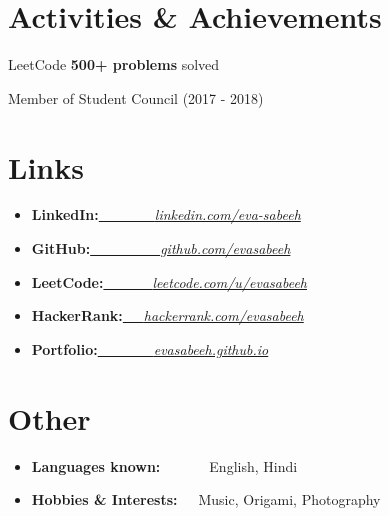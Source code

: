 \documentclass[a4paper,20pt]{article}
\newcommand{\resumeSimpleItem}[2]{
  \item\small{
    {#1}{#2 \vspace{-2pt}}
  }
}
\newcommand{\resumeSimpleSubItem}[2]{\resumeSimpleItem{#1}{#2}\vspace{-3pt}}
\newcommand{\resumeSubHeadingSimpleListStart}{\begin{itemize}[leftmargin=*]}
\newcommand{\resumeSubHeadingSimpleListEnd}{\end{itemize}}
\begin{document}
\section{Activities \& Achievements}
\begin{description}[font=$\bullet$]
  \item {LeetCode \textbf{500+ problems} solved}
  \vspace{-5pt}
  \item {Member of Student Council (2017 - 2018)}
  \vspace{-5pt}
  \end{description}
\vspace{2pt}



\section{Links}
\resumeSubHeadingSimpleListStart
\resumeSimpleSubItem{\textbf{LinkedIn:}}{\href{https://www.linkedin.com/in/eva-sabeeh/}{~~~~~~~~\emph{linkedin.com/eva-sabeeh}}}
\vspace{-1pt}
\resumeSimpleSubItem{\textbf{GitHub:}}{\href{https://www.github.com/evasabeeh/}{~~~~~~~~~~\emph{github.com/evasabeeh}}}
\vspace{-1pt}
\resumeSimpleSubItem{\textbf{LeetCode:}}{\href{https://www.leetcode.com/u/evasabeeh/}{~~~~~~~\emph{leetcode.com/u/evasabeeh}}}
\vspace{-1pt}
\resumeSimpleSubItem{\textbf{HackerRank:}}{\href{https://www.hackerrank.com/profile/evasabeeh}{~~~\emph{hackerrank.com/evasabeeh}}}
\vspace{-1pt}
\resumeSimpleSubItem{\textbf{Portfolio:}}{\href{https://evasabeeh.github.io/}{~~~~~~~~\emph{evasabeeh.github.io}}}
\vspace{-1pt}
\resumeSubHeadingSimpleListEnd
\vspace{2pt}



\section{Other}
\resumeSubHeadingSimpleListStart
\resumeSimpleSubItem {\textbf{Languages known:}}{~~~~~~~English, Hindi}
\vspace{-1pt}
\resumeSimpleSubItem{\textbf{Hobbies \& Interests:}}{~~~Music, Origami, Photography}
\resumeSubHeadingSimpleListEnd
\vspace{2pt}
\end{document}
